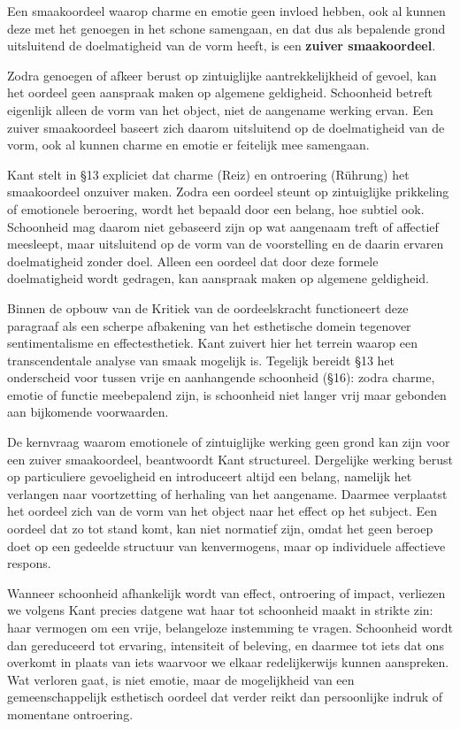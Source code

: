 Een smaakoordeel waarop charme en emotie geen invloed hebben, ook al kunnen deze met het genoegen in het schone samengaan, en dat dus als bepalende grond uitsluitend de doelmatigheid van de vorm heeft, is een \textbf{zuiver smaakoordeel}.

\begin{mdframed}[leftmargin=0pt,rightmargin=0pt,backgroundcolor=blue!6,linecolor=white,innertopmargin=6pt,innerbottommargin=6pt]

Zodra genoegen of afkeer berust op zintuiglijke aantrekkelijkheid of gevoel, kan het oordeel geen aanspraak maken op algemene geldigheid.
Schoonheid betreft eigenlijk alleen de vorm van het object, niet de aangename werking ervan.
Een zuiver smaakoordeel baseert zich daarom uitsluitend op de doelmatigheid van de vorm, ook al kunnen charme en emotie er feitelijk mee samengaan.

\bigskip
Kant stelt in §13 expliciet dat charme (Reiz) en ontroering (Rührung) het smaakoordeel onzuiver maken. Zodra een oordeel steunt op zintuiglijke prikkeling of emotionele beroering, wordt het bepaald door een belang, hoe subtiel ook. Schoonheid mag daarom niet gebaseerd zijn op wat aangenaam treft of affectief meesleept, maar uitsluitend op de vorm van de voorstelling en de daarin ervaren doelmatigheid zonder doel. Alleen een oordeel dat door deze formele doelmatigheid wordt gedragen, kan aanspraak maken op algemene geldigheid.

Binnen de opbouw van de Kritiek van de oordeelskracht functioneert deze paragraaf als een scherpe afbakening van het esthetische domein tegenover sentimentalisme en effectesthetiek. Kant zuivert hier het terrein waarop een transcendentale analyse van smaak mogelijk is. Tegelijk bereidt §13 het onderscheid voor tussen vrije en aanhangende schoonheid (§16): zodra charme, emotie of functie meebepalend zijn, is schoonheid niet langer vrij maar gebonden aan bijkomende voorwaarden.

De kernvraag waarom emotionele of zintuiglijke werking geen grond kan zijn voor een zuiver smaakoordeel, beantwoordt Kant structureel. Dergelijke werking berust op particuliere gevoeligheid en introduceert altijd een belang, namelijk het verlangen naar voortzetting of herhaling van het aangename. Daarmee verplaatst het oordeel zich van de vorm van het object naar het effect op het subject. Een oordeel dat zo tot stand komt, kan niet normatief zijn, omdat het geen beroep doet op een gedeelde structuur van kenvermogens, maar op individuele affectieve respons.

Wanneer schoonheid afhankelijk wordt van effect, ontroering of impact, verliezen we volgens Kant precies datgene wat haar tot schoonheid maakt in strikte zin: haar vermogen om een vrije, belangeloze instemming te vragen. Schoonheid wordt dan gereduceerd tot ervaring, intensiteit of beleving, en daarmee tot iets dat ons overkomt in plaats van iets waarvoor we elkaar redelijkerwijs kunnen aanspreken. Wat verloren gaat, is niet emotie, maar de mogelijkheid van een gemeenschappelijk esthetisch oordeel dat verder reikt dan persoonlijke indruk of momentane ontroering.
\end{mdframed}

